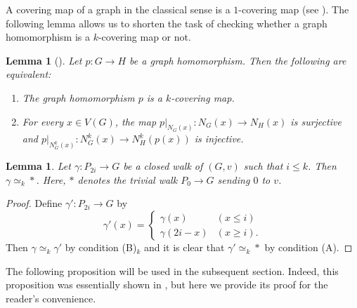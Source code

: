 \documentclass[11pt, amsfonts]{amsart}
\numberwithin{equation}{section}
\newtheorem{lemma}[thm]{Lemma}
\theoremstyle{definition}
\theoremstyle{remark}
\begin{document}
A covering map of a graph in the classical sense is a $1$-covering map (see \cite{GR}). The following lemma allows us to shorten the task of checking whether a graph homomorphism is a $k$-covering map or not.

\begin{lemma}[{\cite[Lemma~6.2]{MatsushitaJMSUT}}] \label{lemma checking criterion}
Let $p \colon G \to H$ be a graph homomorphism. Then the following are equivalent:
\begin{enumerate}[(1)]
\item The graph homomorphism $p$ is a $k$-covering map.

\item For every $x \in V(G)$, the map $p|_{N_G(x)} \colon N_G(x) \to N_H(x)$ is surjective and $p|_{N^k_G(x)} \colon N^k_G(x) \to N^k_H(p(x))$ is injective.
\end{enumerate}
\end{lemma}

\begin{lemma} \label{lemma short walk}
Let $\gamma \colon P_{2i} \to G$ be a closed walk of $(G,v)$ such that $i \le k$. Then $\gamma \simeq_ k *$. Here, $*$ denotes the trivial walk $P_0 \to G$ sending $0$ to $v$.
\end{lemma}
\begin{proof}
Define $\gamma' \colon P_{2i} \to G$ by
\[ \gamma'(x) = \begin{cases}
\gamma(x) & (x \le i) \\
\gamma(2i - x) & (x \ge i).
\end{cases}\]
Then $\gamma \simeq_k \gamma'$ by condition (B)$_k$ and it is clear that $\gamma' \simeq_k *$ by condition (A).
\end{proof}

The following proposition will be used in the subsequent section. Indeed, this proposition was essentially shown in \cite{MatsushitaJMSUT}, but here we provide its proof for the reader's convenience.
\end{document}
